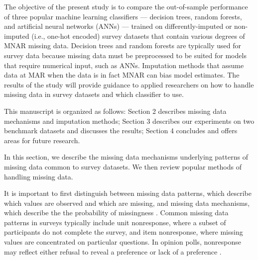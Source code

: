 \documentclass[10pt]{book}
\theoremstyle{definition}
\begin{document}
The objective of the present study is to compare the out-of-sample performance of three popular machine learning classifiers --- decision trees, random forests, and artificial neural networks (ANNs) --- trained on differently-imputed or non-imputed (i.e., one-hot encoded) survey datasets that contain various degrees of MNAR missing data. Decision trees and random forests are typically used for survey data because missing data must be preprocessed to be suited for models that require numerical input, such as ANNs. Imputation methods that assume data at MAR when the data is in fact MNAR can bias model estimates. The results of the study will provide guidance to applied researchers on how to handle missing data in survey datasets and which classifier to use. 

This manuscript is organized as follows: Section 2 describes missing data mechanisms and imputation methods; Section 3 describes our experiments on two benchmark datasets and discusses the results; Section 4 concludes and offers areas for future research. 

\par

\lhead[\footnotesize\thepage\fancyplain{}\leftmark]{}\rhead[]{\fancyplain{}\rightmark\footnotesize\thepage}%

\setcounter{chapter}{2}
\setcounter{equation}{0} %

In this section, we describe the missing data mechanisms underlying patterns of missing data common to survey datasets. We then review popular methods of handling missing data.

\par
{}

It is important to first distinguish between missing data patterns, which describe which values are observed and which are missing, and missing data mechanisms, which describe the the probability of missingness  \citep[Chap.~1]{little2014}. Common missing data patterns in surveys typically include unit nonresponse, where a subset of participants do not complete the survey, and item nonresponse, where missing values are concentrated on particular questions. In opinion polls, nonresponse may reflect either refusal to reveal a preference or lack of a preference \citep{de2003prevention}. 
\end{document}
